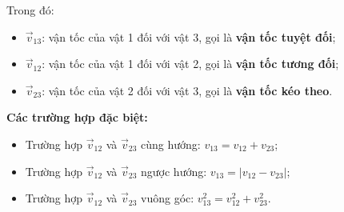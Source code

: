 \begin{enumerate}[label=\bfseries\Roman*.]
\begin{center}
	 \end{center}
	 Trong đó:
	 \begin{itemize}
	 	\item $\vec{v}_{13}$: vận tốc của vật 1 đối với vật 3, gọi là \textbf{vận tốc tuyệt đối};
	 	\item $\vec{v}_{12}$: vận tốc của vật 1 đối với vật 2, gọi là \textbf{vận tốc tương đối};
	 	\item $\vec{v}_{23}$: vận tốc của vật 2 đối với vật 3, gọi là \textbf{vận tốc kéo theo}.
	 \end{itemize}
	 \textbf{Các trường hợp đặc biệt:}
	 \begin{itemize}
	 	\item Trường hợp $\vec{v}_{12}$ và $\vec{v}_{23}$ cùng hướng: $v_{13}=v_{12}+v_{23}$;
	 	\item Trường hợp $\vec{v}_{12}$ và $\vec{v}_{23}$ ngược hướng: $v_{13}=\left|v_{12}-v_{23}\right|$;
	 	\item Trường hợp $\vec{v}_{12}$ và $\vec{v}_{23}$ vuông góc: $v^2_{13}=v^2_{12}+v^2_{23}$.
	 \end{itemize}
\end{enumerate}
